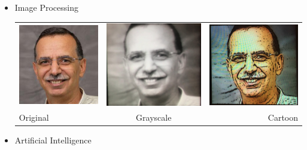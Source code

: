 \documentclass{sig-alternate}
\begin{document}
\begin{itemize}
\item Image Processing\newline
\begin{tabular}{l | c | r }
\noindent \includegraphics[scale=.3]{OrigImage.png} & \includegraphics[scale=.3]{grayScale.png} &\noindent \includegraphics[scale=.3]{CartoonEffect.png} \\
Original & Grayscale & Cartoon \\
\end{tabular}
\item Artificial Intelligence\newline
\begin{tabular}{l | r }

\end{tabular}
\end{itemize}
\end{document}
